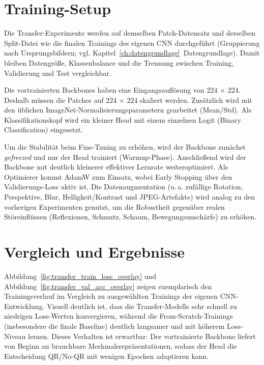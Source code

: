 \section{Training-Setup}
\label{sec:transfer_setup}

Die Transfer-Experimente werden auf demselben Patch-Datensatz und derselben Split-Datei wie die finalen Trainings des eigenen \ac{CNN} durchgeführt (Gruppierung nach Ursprungsbildern; vgl. Kapitel~\ref{ch:datengrundlage}~Datengrundlage). Damit bleiben Datengröße, Klassenbalance und die Trennung zwischen Training, Validierung und Test vergleichbar.

Die vortrainierten Backbones haben eine Eingangsauflösung von $224\,\times\,224$. Deshalb müssen die Patches auf $224\,\times\,224$ skaliert werden. Zusätzlich wird mit den üblichen ImageNet-Normalisierungsparametern gearbeitet (Mean/Std). Als Klassifikationskopf wird ein kleiner Head mit einem einzelnen Logit (Binary Classification) eingesetzt.

Um die Stabilität beim Fine-Tuning zu erhöhen, wird der Backbone zunächst \textit{gefreezed} und nur der Head trainiert (Warmup-Phase). Anschließend wird der Backbone mit deutlich kleinerer effektiver Lernrate weiteroptimiert. Als Optimierer kommt AdamW zum Einsatz, wobei Early Stopping über den Validierungs-Loss aktiv ist. Die Datenaugmentation (u.\,a. zufällige Rotation, Perspektive, Blur, Helligkeit/Kontrast und JPEG-Artefakte) wird analog zu den vorherigen Experimenten genutzt, um die Robustheit gegenüber realen Störeinflüssen (Reflexionen, Schmutz, Schaum, Bewegungsunschärfe) zu erhöhen.

\section{Vergleich und Ergebnisse}
\label{sec:transfer_ergebnisse}

Abbildung~\ref{fig:transfer_train_loss_overlay} und Abbildung~\ref{fig:transfer_val_acc_overlay} zeigen exemplarisch den Trainingsverlauf im Vergleich zu ausgewählten Trainings der eigenen \ac{CNN}-Entwicklung. Visuell deutlich ist, dass die Transfer-Modelle sehr schnell zu niedrigen Loss-Werten konvergieren, während die From-Scratch-Trainings (insbesondere die finale Baseline) deutlich langsamer und mit höherem Loss-Niveau lernen. Dieses Verhalten ist erwartbar: Der vortrainierte Backbone liefert von Beginn an brauchbare Merkmalsrepräsentationen, sodass der Head die Entscheidung \ac{QR}/No-\ac{QR} mit wenigen Epochen adaptieren kann.

